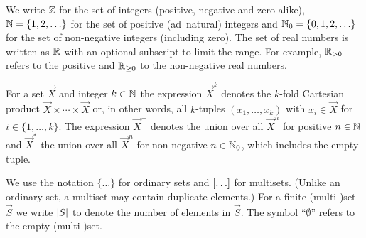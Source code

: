 
%



We write \(\mathbb{Z}\) for the set of integers (positive, negative and zero alike), \(\mathbb{N}=\{1,2,\ldots\}\) for the set
of positive (\acs{ad}~natural) integers and \(\mathbb{N}_0=\{0,1,2,\ldots\}\) for the set of non-negative integers (including
zero).  The set of real numbers is written as \(\Reals\) with an optional subscript to limit the range.  For example,
\(\RealsPos\) refers to the positive and \(\RealsNN\) to the non-negative real numbers.

For a set \(\Vec{X}\) and integer \(k\in\mathbb{N}\) the expression \(\Vec{X}^k\) denotes the \(k\)-fold Cartesian product
\(\Vec{X}\times\cdots\times\Vec{X}\) or, in other words, all \(k\)-tuples \((x_1,\ldots,x_k)\) with \(x_i\in\Vec{X}\)
for \(i\in\{1,\ldots,k\}\).  The expression \(\Vec{X}^+\) denotes the union over all \(\Vec{X}^n\) for positive
\(n\in\mathbb{N}\) and \(\Vec{X}^*\) the union over all \(\Vec{X}^n\) for non-negative \(n\in\mathbb{N}_0\), which includes the
empty tuple.

We use the notation \(\{\ldots\}\) for ordinary sets and \(\left[\ldots\right]\) for multisets.  (Unlike an ordinary set,
a multiset may contain duplicate elements.)  For a finite (multi-)set \(\Vec{S}\) we write \(\left\lvert\relax{S}\right\rvert\) to denote
the number of elements in \(\Vec{S}\).  The symbol \enquote{\(\emptyset\)} refers to the empty (multi-)set.

